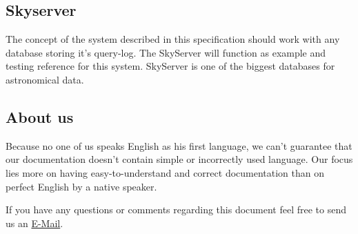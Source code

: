 \subsection*{Skyserver}
The concept of the system described in this specification should work with any database
storing it's query-log. The \gls{SkyServer} will function
as example and testing reference for this system. SkyServer is one of the biggest databases for astronomical data.
 
\subsection*{About us}
Because no one of us speaks English as his first language,
we can't guarantee that our documentation doesn't contain simple
or incorrectly used language. Our focus lies more on
having easy-to-understand and correct documentation
than on perfect English by a native speaker.

If you have any questions or comments regarding this document feel free to send us an 
 \href{mailto:pse10-group14-ws12@ira.uni-karlsruhe.de}{E-Mail}.







